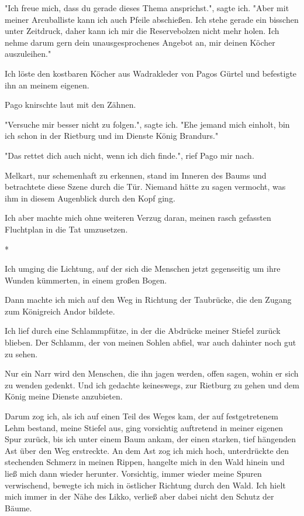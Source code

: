 \documentclass[10pt, a4paper, oneside]{book}
\begin{document}
\begin{multicols}{2}
"Ich freue mich, dass du gerade dieses Thema ansprichst.", sagte ich.
"Aber mit
meiner Arcuballiste kann ich auch Pfeile abschießen. Ich stehe gerade ein bisschen unter Zeitdruck, daher kann ich mir die Reservebolzen nicht mehr holen. Ich nehme darum gern dein unausgesprochenes Angebot an, mir deinen Köcher auszuleihen."

Ich löste den kostbaren Köcher aus Wadrakleder von Pagos Gürtel und
befestigte ihn an meinem eigenen.

Pago knirschte laut mit den Zähnen.

"Versuche mir besser nicht zu folgen.", sagte ich. "Ehe jemand mich einholt, bin ich schon in der Rietburg und im Dienste König Brandurs."

"Das rettet dich auch nicht, wenn ich dich finde.", rief Pago mir nach.

Melkart, nur schemenhaft zu erkennen, stand im Inneren des Baums und betrachtete diese Szene durch die Tür. Niemand hätte zu sagen vermocht, was ihm in diesem Augenblick durch den Kopf ging.

Ich aber machte mich ohne weiteren Verzug daran, meinen rasch gefassten Fluchtplan in die Tat umzusetzen.

\begin{center}
    *
\end{center}

Ich umging die Lichtung, auf der sich die Menschen jetzt gegenseitig um ihre Wunden kümmerten, in einem großen Bogen.

Dann machte ich mich auf den Weg in Richtung der Taubrücke, die den Zugang zum Königreich Andor bildete.

Ich lief durch eine Schlammpfütze, in der die Abdrücke meiner Stiefel zurück blieben. Der Schlamm, der von meinen Sohlen abfiel, war auch dahinter noch gut zu sehen.

Nur ein Narr wird den Menschen, die ihn jagen werden, offen sagen, wohin er sich zu wenden gedenkt. Und ich gedachte keineswegs, zur Rietburg zu gehen und dem König meine Dienste anzubieten.

Darum zog ich, als ich auf einen Teil des Weges kam, der auf festgetretenem Lehm bestand, meine Stiefel aus, ging vorsichtig auftretend in meiner eigenen Spur zurück, bis ich unter einem Baum ankam, der einen starken, tief hängenden Ast über den Weg erstreckte. An dem Ast zog ich mich hoch, unterdrückte den stechenden Schmerz in meinen Rippen, hangelte mich in den Wald hinein und ließ mich dann wieder herunter. Vorsichtig, immer wieder meine Spuren verwischend, bewegte ich mich in östlicher Richtung durch den Wald. Ich hielt mich immer in der Nähe des Likko, verließ aber dabei nicht den Schutz der Bäume.


\end{multicols}
\end{document}
